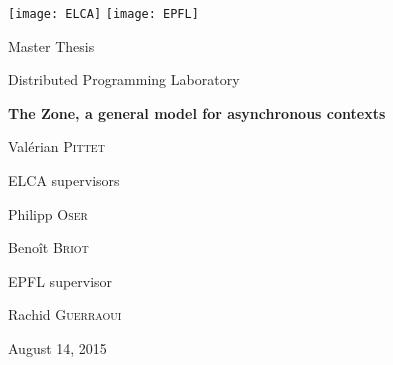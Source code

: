 \begin{titlepage}

  \newcommand{\rightside}[1]{
    \begin{flushright}
      \begin{minipage}[t]{0.48\textwidth}
        #1
      \end{minipage}
    \end{flushright}
  }


  \begin{center}
    \texttt{[image: ELCA]}
    \hfill
    \texttt{[image: EPFL]} \\[2cm]


    \rightside{
      \Large
      Master Thesis
      
      \small
      Distributed Programming Laboratory
    }


    \HRule
    \vspace{\baselineskip}

    \LARGE
    \textbf{
      The Zone, a general model for asynchronous contexts
    }
    \normalsize
    \HRule
    
    \rightside{

      \vspace{1\baselineskip}

      \Large
      Val\'erian \textsc{Pittet}

      \vspace{2\baselineskip}

      \normalsize
      ELCA supervisors
      \smallskip
      \large
      \begin{list}{ }{}
      \item Philipp \textsc{Oser}
      \item Beno\^it \textsc{Briot}
      \end{list}
      
      \vspace{\baselineskip}

      \normalsize
      EPFL supervisor
      \smallskip
      \large
      \begin{list}{ }{}
      \item Rachid \textsc{Guerraoui}
      \end{list}


    }


    \vfill

    \normalsize
    August 14, 2015

  \end{center}

\end{titlepage}